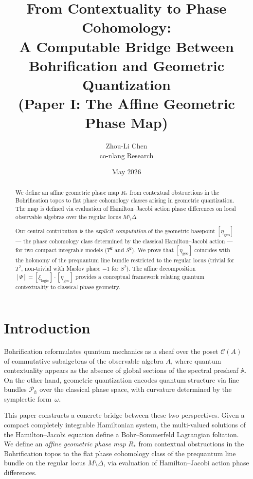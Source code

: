 \documentclass[11pt]{article}
\title{From Contextuality to Phase Cohomology:\\
A Computable Bridge Between Bohrification and Geometric Quantization\\
{\large (Paper I: The Affine Geometric Phase Map)}}
\author{Zhou-Li Chen \\ co-nlang Research}
\date{May 2026}
\begin{document}
\maketitle

\begin{abstract}
We define an affine geometric phase map $R_*$ from contextual obstructions
in the Bohrification topos to flat phase cohomology classes arising in
geometric quantization. The map is defined via evaluation of Hamilton--Jacobi
action phase differences on local observable algebras over the regular locus
$M \setminus \Delta$.

Our central contribution is the \emph{explicit computation} of the geometric
basepoint $[\eta_{\mathrm{geo}}]$ --- the phase cohomology class determined
by the classical Hamilton--Jacobi action --- for two compact integrable
models ($T^2$ and $S^2$). We prove that $[\eta_{\mathrm{geo}}]$ coincides
with the holonomy of the prequantum line bundle restricted to the regular
locus (trivial for $T^2$, non-trivial with Maslov phase $-1$ for $S^2$).
The affine decomposition $[\Psi] = [\xi_{\mathrm{logic}}] \cdot [\eta_{\mathrm{geo}}]$
provides a conceptual framework relating quantum contextuality to
classical phase geometry.
\end{abstract}

\section{Introduction}

Bohrification \cite{HLS11, Lan16} reformulates quantum mechanics as a
sheaf over the poset $\mathcal{C}(A)$ of commutative subalgebras of the
observable algebra $A$, where quantum contextuality appears as the
absence of global sections of the spectral presheaf $\underline{\mathbb{A}}$.
On the other hand, geometric quantization \cite{BW97} encodes quantum
structure via line bundles $\mathcal{P}_\hbar$ over the classical phase
space, with curvature determined by the symplectic form~$\omega$.

This paper constructs a concrete bridge between these two perspectives.
Given a compact completely integrable Hamiltonian system, the multi-valued
solutions of the Hamilton--Jacobi equation define a Bohr--Sommerfeld
Lagrangian foliation. We define an \emph{affine geometric phase map} $R_*$
from contextual obstructions in the Bohrification topos to the flat phase
cohomology class of the prequantum line bundle on the regular locus
$M \setminus \Delta$, via evaluation of Hamilton--Jacobi action phase differences.
\end{document}
